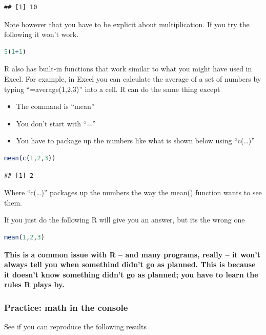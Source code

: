 \documentclass[
]{book}
\providecommand{\tightlist}{%
  \setlength{\itemsep}{0pt}\setlength{\parskip}{0pt}}
\begin{document}
\begin{lstlisting}
## [1] 10
\end{lstlisting}

Note however that you have to be explicit about multiplication. If you try the following it won't work.

\begin{lstlisting}[language=R]
5(1+1)
\end{lstlisting}

R also has built-in functions that work similar to what you might have used in Excel. For example, in Excel you can calculate the average of a set of numbers by typing ``=average(1,2,3)'' into a cell. R can do the same thing except

\begin{itemize}
\tightlist
\item
  The command is ``mean''
\item
  You don't start with ``=''
\item
  You have to package up the numbers like what is shown below using ``c(\ldots)''
\end{itemize}

\begin{lstlisting}[language=R]
mean(c(1,2,3))
\end{lstlisting}

\begin{lstlisting}
## [1] 2
\end{lstlisting}

Where ``c(\ldots)'' packages up the numbers the way the mean() function wants to see them.

If you just do the following R will give you an answer, but its the wrong one

\begin{lstlisting}[language=R]
mean(1,2,3)
\end{lstlisting}

\textbf{This is a common issue with R -- and many programs, really -- it won't always tell you when somethind didn't go as planned. This is because it doesn't know something didn't go as planned; you have to learn the rules R plays by.}

\hypertarget{practice-math-in-the-console}{%
\subsubsection{Practice: math in the console}\label{practice-math-in-the-console}}

See if you can reproduce the following results
\end{document}
